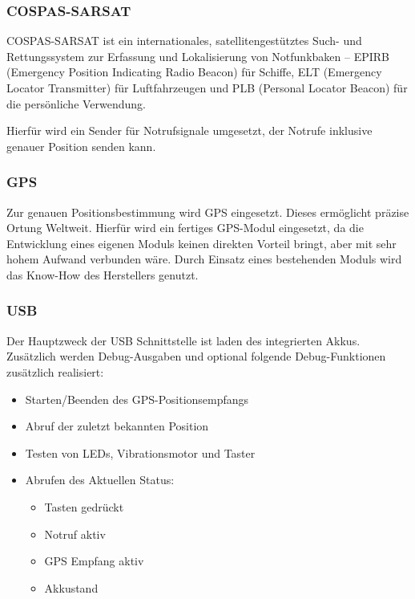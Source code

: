 \subsubsection{COSPAS-SARSAT}

COSPAS-SARSAT ist ein internationales, satellitengestütztes Such- und Rettungssystem zur Erfassung und Lokalisierung von Notfunkbaken – EPIRB (Emergency Position Indicating Radio Beacon) für Schiffe, ELT (Emergency Locator Transmitter) für Luftfahrzeugen und PLB (Personal Locator Beacon) für die persönliche Verwendung.

Hierfür wird ein Sender für Notrufsignale umgesetzt, der Notrufe inklusive genauer Position senden kann.

\subsubsection{GPS}

Zur genauen Positionsbestimmung wird GPS eingesetzt. Dieses ermöglicht präzise Ortung Weltweit.
Hierfür wird ein fertiges GPS-Modul eingesetzt, da die Entwicklung eines eigenen Moduls keinen direkten Vorteil bringt, aber mit sehr hohem Aufwand verbunden wäre. Durch Einsatz eines bestehenden Moduls wird das Know-How des Herstellers genutzt.

\subsubsection{USB}

Der Hauptzweck der USB Schnittstelle ist laden des integrierten Akkus. Zusätzlich werden Debug-Ausgaben und optional folgende Debug-Funktionen zusätzlich realisiert:

\begin{itemize}
	\item Starten/Beenden des GPS-Positionsempfangs
	\item Abruf der zuletzt bekannten Position
	\item Testen von LEDs, Vibrationsmotor und Taster
	\item Abrufen des Aktuellen Status:
	\begin{itemize}
		\item Tasten gedrückt
		\item Notruf aktiv
		\item GPS Empfang aktiv
		\item Akkustand
	\end{itemize}
\end{itemize}

